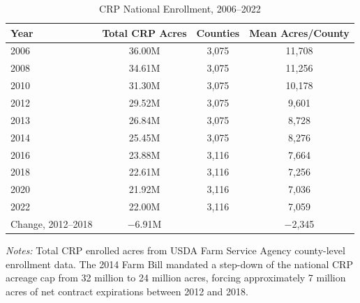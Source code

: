 \begin{table}[t]
\centering
\caption{CRP National Enrollment, 2006--2022}
\label{tab:crp_ts}
\begin{tabular}{lccc}
\hline\hline
Year & Total CRP Acres & Counties & Mean Acres/County \\
\hline
2006 & 36.00M & 3,075 & 11,708 \\
2008 & 34.61M & 3,075 & 11,256 \\
2010 & 31.30M & 3,075 & 10,178 \\
2012 & 29.52M & 3,075 & 9,601 \\
2013 & 26.84M & 3,075 & 8,728 \\
2014 & 25.45M & 3,075 & 8,276 \\
2016 & 23.88M & 3,116 & 7,664 \\
2018 & 22.61M & 3,116 & 7,256 \\
2020 & 21.92M & 3,116 & 7,036 \\
2022 & 22.00M & 3,116 & 7,059 \\
\hline
Change, 2012--2018 & $-$6.91M & & $-$2,345 \\
\hline\hline
\end{tabular}
\begin{tablenotes}[flushleft]\small
\item \textit{Notes:} Total CRP enrolled acres from USDA Farm Service Agency county-level enrollment data. The 2014 Farm Bill mandated a step-down of the national CRP acreage cap from 32 million to 24 million acres, forcing approximately 7 million acres of net contract expirations between 2012 and 2018.
\end{tablenotes}
\end{table}

